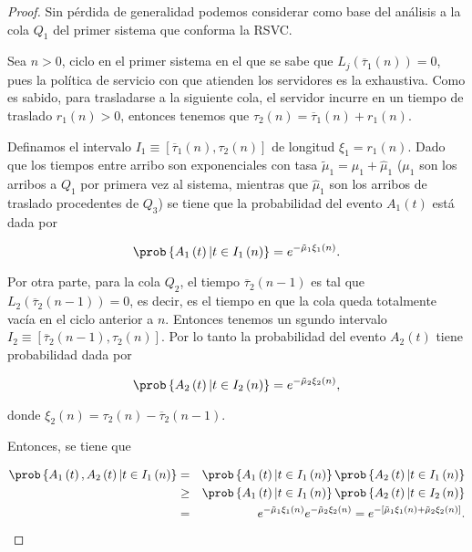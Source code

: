 \begin{proof}
Sin p\'erdida de generalidad podemos considerar como base del an\'alisis a la cola $Q_{1}$ del primer sistema que conforma la RSVC.

Sea $n>0$, ciclo en el primer sistema en el que se sabe que $L_{j}\left(\overline{\tau}_{1}\left(n\right)\right)=0$, pues la pol\'itica de servicio con que atienden los servidores es la exhaustiva. Como es sabido, para trasladarse a la siguiente cola, el servidor incurre en un tiempo de traslado $r_{1}\left(n\right)>0$, entonces tenemos que $\tau_{2}\left(n\right)=\overline{\tau}_{1}\left(n\right)+r_{1}\left(n\right)$.


Definamos el intervalo $I_{1}\equiv\left[\overline{\tau}_{1}\left(n\right),\tau_{2}\left(n\right)\right]$ de longitud $\xi_{1}=r_{1}\left(n\right)$. Dado que los tiempos entre arribo son exponenciales con tasa $\tilde{\mu}_{1}=\mu_{1}+\hat{\mu}_{1}$ ($\mu_{1}$ son los arribos a $Q_{1}$ por primera vez al sistema, mientras que $\hat{\mu}_{1}$ son los arribos de traslado procedentes de $Q_{3}$) se tiene que la probabilidad del evento $A_{1}\left(t\right)$ est\'a dada por 

\begin{equation}
\prob\left\{A_{1}\left(t\right)|t\in I_{1}\left(n\right)\right\}=e^{-\tilde{\mu}_{1}\xi_{1}\left(n\right)}.
\end{equation} 

Por otra parte, para la cola $Q_{2}$, el tiempo $\overline{\tau}_{2}\left(n-1\right)$ es tal que $L_{2}\left(\overline{\tau}_{2}\left(n-1\right)\right)=0$, es decir, es el tiempo en que la cola queda totalmente vac\'ia en el ciclo anterior a $n$. Entonces tenemos un sgundo intervalo $I_{2}\equiv\left[\overline{\tau}_{2}\left(n-1\right),\tau_{2}\left(n\right)\right]$. Por lo tanto la probabilidad del evento $A_{2}\left(t\right)$ tiene probabilidad dada por

\begin{equation}
\prob\left\{A_{2}\left(t\right)|t\in I_{2}\left(n\right)\right\}=e^{-\tilde{\mu}_{2}\xi_{2}\left(n\right)},
\end{equation} 

donde $\xi_{2}\left(n\right)=\tau_{2}\left(n\right)-\overline{\tau}_{2}\left(n-1\right)$.



Entonces, se tiene que

\begin{eqnarray*}
\prob\left\{A_{1}\left(t\right),A_{2}\left(t\right)|t\in I_{1}\left(n\right)\right\}&=&
\prob\left\{A_{1}\left(t\right)|t\in I_{1}\left(n\right)\right\}
\prob\left\{A_{2}\left(t\right)|t\in I_{1}\left(n\right)\right\}\\
&\geq&
\prob\left\{A_{1}\left(t\right)|t\in I_{1}\left(n\right)\right\}
\prob\left\{A_{2}\left(t\right)|t\in I_{2}\left(n\right)\right\}\\
&=&e^{-\tilde{\mu}_{1}\xi_{1}\left(n\right)}e^{-\tilde{\mu}_{2}\xi_{2}\left(n\right)}
=e^{-\left[\tilde{\mu}_{1}\xi_{1}\left(n\right)+\tilde{\mu}_{2}\xi_{2}\left(n\right)\right]}.
\end{eqnarray*}



\end{proof}

